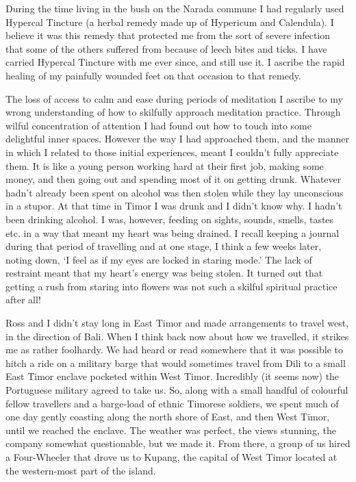 During the time living in the bush on the Narada commune I had regularly
used Hypercal Tincture (a herbal remedy made up of Hypericum and
Calendula). I believe it was this remedy that protected me from the sort
of severe infection that some of the others suffered from because of
leech bites and ticks. I have carried Hypercal Tincture with me ever
since, and still use it. I ascribe the rapid healing of my painfully
wounded feet on that occasion to that remedy.

The loss of access to calm and ease during periods of meditation I
ascribe to my wrong understanding of how to skilfully approach
meditation practice. Through wilful concentration of attention I had
found out how to touch into some delightful inner spaces. However the
way I had approached them, and the manner in which I related to those
initial experiences, meant I couldn't fully appreciate them. It is like
a young person working hard at their first job, making some money, and
then going out and spending most of it on getting drunk. Whatever hadn't
already been spent on alcohol was then stolen while they lay unconscious
in a stupor. At that time in Timor I was drunk and I didn't know why. I
hadn't been drinking alcohol. I was, however, feeding on sights, sounds,
smells, tastes etc. in a way that meant my heart was being drained. I
recall keeping a journal during that period of travelling and at one
stage, I think a few weeks later, noting down, `I feel as if my eyes are
locked in staring mode.' The lack of restraint meant that my heart's
energy was being stolen. It turned out that getting a rush from staring
into flowers was not such a skilful spiritual practice after all!

Ross and I didn't stay long in East Timor and made arrangements to
travel west, in the direction of Bali. When I think back now about how
we travelled, it strikes me as rather foolhardy. We had heard or read
somewhere that it was possible to hitch a ride on a military barge that
would sometimes travel from Dili to a small East Timor enclave pocketed
within West Timor. Incredibly (it seems now) the Portuguese military
agreed to take us. So, along with a small handful of colourful fellow
travellers and a barge-load of ethnic Timorese soldiers, we spent much
of one day gently coasting along the north shore of East, and then West
Timor, until we reached the enclave. The weather was perfect, the views
stunning, the company somewhat questionable, but we made it. From there,
a group of us hired a Four-Wheeler that drove us to Kupang, the capital
of West Timor located at the western-most part of the island.

